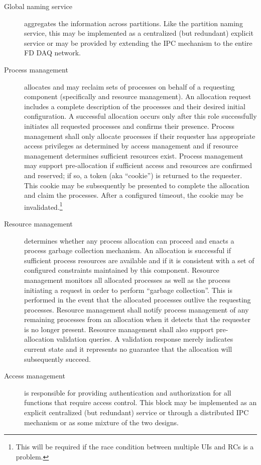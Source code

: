 \begin{description}
\item[Global naming service] aggregates the  information across partitions.  Like the partition naming service, this may be implemented as a centralized (but redundant) explicit service or may be provided by extending the IPC  mechanism to the entire FD DAQ network.

\item[Process management] allocates and may reclaim sets of processes on behalf of a requesting component (specifically  and resource management). 
  An allocation request includes a complete description of the processes and their desired initial configuration. 
  A successful allocation occurs only after this role successfully initiates all requested processes and confirms their presence. 
  Process management shall only allocate processes if their requester has appropriate access privileges as determined by access management and if resource management determines sufficient resources exist. 
  Process management may support pre-allocation if sufficient access and resources are confirmed and reserved; if so, a token (aka ``cookie'') is returned to the requester. 
  This cookie may be subsequently be presented to complete the allocation and claim the processes. 
  After a configured timeout, the cookie may be invalidated.\footnote{This will be required if the race condition between multiple UIs and RCs is a problem.}  
  
\item[Resource management] determines whether any process allocation can proceed and enacts a process garbage collection mechanism. 
  An allocation is successful if sufficient process resources are available and if it is consistent with a set of configured constraints maintained by this component. 
  Resource management monitors all allocated processes as well as the process initiating a request in order to perform ``garbage collection''. 
  This is performed in the event that the allocated processes outlive the requesting processes.
  Resource management shall notify process management of any remaining processes from an allocation when it detects that the requester is no longer present.
  Resource management shall also support pre-allocation validation queries. 
  A validation response merely indicates current state and it represents no guarantee that the allocation will subsequently succeed.

  
\item[Access management] is responsible for providing authentication and authorization for all  functions that require access control. 
  This block may be implemented as an explicit centralized (but redundant) service or through a distributed IPC mechanism or as some mixture of the two designs. 

\end{description}

